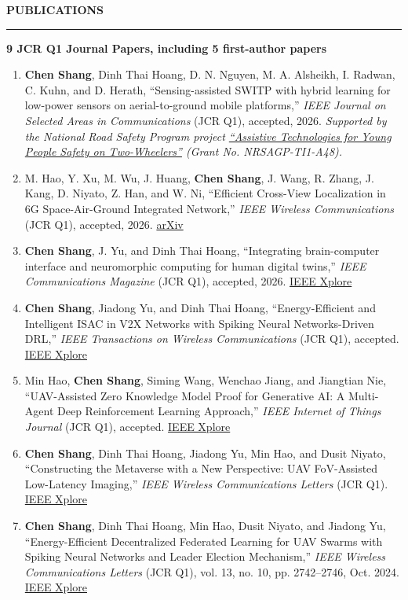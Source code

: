 \documentclass[10pt,a4paper]{article}
\newcommand{\sectionrule}[1]{
  \vspace{0.55em}
  {\large\bfseries #1\par}
  \vspace{0.20em}
  \hrule
  \vspace{0.45em}
}
\newcommand{\pubitem}[1]{
  \item #1
}
\begin{document}
\sectionrule{PUBLICATIONS}
\textbf{9 JCR Q1 Journal Papers, including 5 first-author papers}
\begin{enumerate}[leftmargin=1.6em,itemsep=1pt,topsep=2pt]
  \pubitem{\hypertarget{pub:jsac}{}\textbf{Chen Shang}, Dinh Thai Hoang, D. N. Nguyen, M. A. Alsheikh, I. Radwan, C. Kuhn, and D. Herath, ``Sensing-assisted SWITP with hybrid learning for low-power sensors on aerial-to-ground mobile platforms,'' \textit{IEEE Journal on Selected Areas in Communications} (JCR Q1), accepted, 2026. \textit{Supported by the National Road Safety Program project \href{https://researchprofiles.canberra.edu.au/en/projects/assistive-technologies-for-young-people-safety-on-two-wheelers/}{``Assistive Technologies for Young People Safety on Two-Wheelers''} (Grant No. NRSAGP-TI1-A48).}}
  \pubitem{M. Hao, Y. Xu, M. Wu, J. Huang, \textbf{Chen Shang}, J. Wang, R. Zhang, J. Kang, D. Niyato, Z. Han, and W. Ni, ``Efficient Cross-View Localization in 6G Space-Air-Ground Integrated Network,'' \textit{IEEE Wireless Communications} (JCR Q1), accepted, 2026. \href{https://arxiv.org/abs/2603.11398}{arXiv}}
  \pubitem{\textbf{Chen Shang}, J. Yu, and Dinh Thai Hoang, ``Integrating brain-computer interface and neuromorphic computing for human digital twins,'' \textit{IEEE Communications Magazine} (JCR Q1), accepted, 2026. \href{https://ieeexplore.ieee.org/document/11519588}{IEEE Xplore}}
  \pubitem{\textbf{Chen Shang}, Jiadong Yu, and Dinh Thai Hoang, ``Energy-Efficient and Intelligent ISAC in V2X Networks with Spiking Neural Networks-Driven DRL,'' \textit{IEEE Transactions on Wireless Communications} (JCR Q1), accepted. \href{https://ieeexplore.ieee.org/document/11091493}{IEEE Xplore}}
  \pubitem{Min Hao, \textbf{Chen Shang}, Siming Wang, Wenchao Jiang, and Jiangtian Nie, ``UAV-Assisted Zero Knowledge Model Proof for Generative AI: A Multi-Agent Deep Reinforcement Learning Approach,'' \textit{IEEE Internet of Things Journal} (JCR Q1), accepted. \href{https://ieeexplore.ieee.org/document/10858287}{IEEE Xplore}}
  \pubitem{\textbf{Chen Shang}, Dinh Thai Hoang, Jiadong Yu, Min Hao, and Dusit Niyato, ``Constructing the Metaverse with a New Perspective: UAV FoV-Assisted Low-Latency Imaging,'' \textit{IEEE Wireless Communications Letters} (JCR Q1). \href{https://ieeexplore.ieee.org/document/10742922}{IEEE Xplore}}
  \pubitem{\textbf{Chen Shang}, Dinh Thai Hoang, Min Hao, Dusit Niyato, and Jiadong Yu, ``Energy-Efficient Decentralized Federated Learning for UAV Swarms with Spiking Neural Networks and Leader Election Mechanism,'' \textit{IEEE Wireless Communications Letters} (JCR Q1), vol. 13, no. 10, pp. 2742--2746, Oct. 2024. \href{https://ieeexplore.ieee.org/document/10636728}{IEEE Xplore}}

\end{enumerate}
\end{document}
